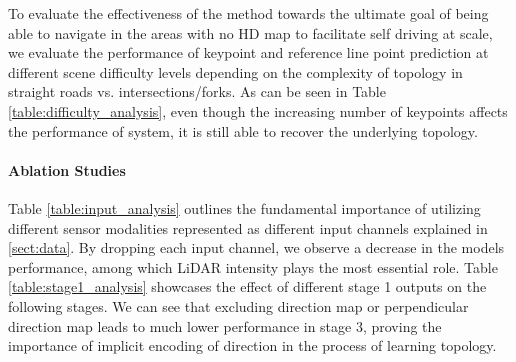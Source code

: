 \documentclass[10pt,twocolumn,letterpaper]{article}
\begin{document}
To evaluate the effectiveness of the method towards the ultimate goal of being able to navigate in the areas with no HD map to facilitate self driving at scale, we evaluate the performance of keypoint and reference line point prediction at different scene difficulty levels depending on the complexity of topology in straight roads vs. intersections/forks. As can be seen in Table \ref{table:difficulty_analysis}, even though the increasing number of keypoints affects the performance of system, it is still able to recover the underlying topology.
\paragraph{Ablation Studies} Table \ref{table:input_analysis} outlines the fundamental importance of utilizing different sensor modalities represented as different input channels explained in \ref{sect:data}. By dropping each input channel, we observe a decrease in the model\textquotesingle s performance, among which LiDAR intensity plays the most essential role. Table \ref{table:stage1_analysis} showcases the effect of different stage 1 outputs on the following stages. We can see that excluding direction map or perpendicular direction map leads to much lower performance in stage 3, proving the importance of implicit encoding of direction in the process of learning topology.
\end{document}
